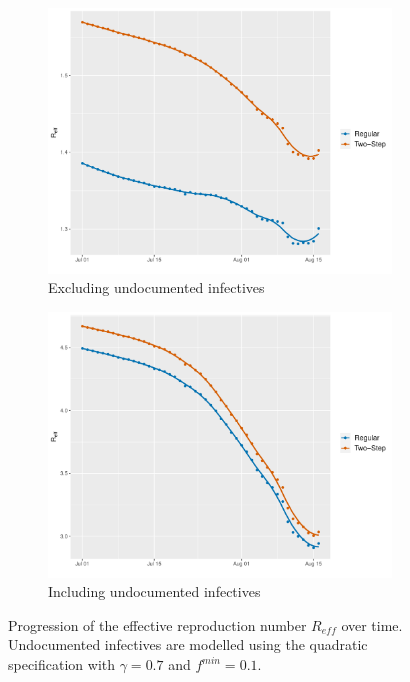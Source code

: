 \documentclass[12pt]{article}
\begin{document}
\begin{appendices}
		\begin{figure}[H]
    	    \centering
    	    \begin{subfigure}{0.495\textwidth}
    	      \centering
    	      \includegraphics[width=\linewidth]{output/panel_data_lag14_Reff_rolling.pdf}
    	      \caption{Excluding undocumented infectives}
    	      \label{fig:Reff_over_time_panel_data}
    	    \end{subfigure}
    	    \begin{subfigure}{0.495\textwidth}
    	      \centering
    	      \includegraphics[width=\linewidth]{output/panel_data_lag14_Reff_UndocQuadratic_rolling.pdf}
    	      \caption{Including undocumented infectives}
    	      \label{fig:Reff_over_time_panel_data_undoc_rolling}
    	    \end{subfigure}
    	    \caption{Progression of the effective reproduction number $R_{eff}$ over time. Undocumented infectives are modelled using the quadratic specification with $\gamma = 0.7$ and $f^{min}=0.1$.}
    	    \label{fig:Reff_over_time_panel_data_all}
    	\end{figure}
		

\end{appendices}
\end{document}
